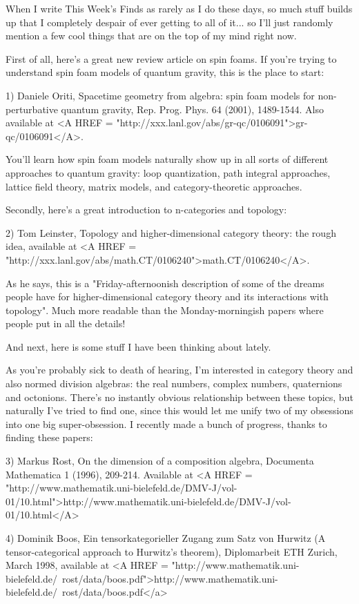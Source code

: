 


When I write This Week's Finds as rarely as I do these days,
so much stuff builds up that I completely despair of ever getting
to all of it... so I'll just randomly mention a few cool things
that are on the top of my mind right now.

First of all, here's a great new review article on spin foams.
If you're trying to understand spin foam models of quantum gravity, 
this is the place to start:

1) Daniele Oriti, Spacetime geometry from algebra: spin foam 
models for non-perturbative quantum gravity,
Rep. Prog. Phys. 64 (2001), 1489-1544.  Also available at
<A HREF = "http://xxx.lanl.gov/abs/gr-qc/0106091">gr-qc/0106091</A>.

You'll learn how spin foam models naturally show up in all sorts 
of different approaches to quantum gravity: loop quantization,
path integral approaches, lattice field theory, matrix models, 
and category-theoretic approaches.  

Secondly, here's a great introduction to n-categories and
topology:

2) Tom Leinster, Topology and higher-dimensional category theory:
the rough idea, available at 
<A HREF = "http://xxx.lanl.gov/abs/math.CT/0106240">math.CT/0106240</A>.

As he says, this is a "Friday-afternoonish description of some
of the dreams people have for higher-dimensional category theory 
and its interactions with topology".  Much more readable than the 
Monday-morningish papers where people put in all the details!

And next, here is some stuff I have been thinking about lately.

As you're probably sick to death of hearing, I'm interested in category
theory and also normed division algebras: the real numbers, complex
numbers, quaternions and octonions.  There's no instantly obvious
relationship between these topics, but naturally I've tried to find
one, since this would let me unify two of my obsessions into one big 
super-obsession.  I recently made a bunch of progress, thanks to finding
these papers:

3) Markus Rost, On the dimension of a composition algebra, 
Documenta Mathematica 1 (1996), 209-214.  Available at 
<A HREF = "http://www.mathematik.uni-bielefeld.de/DMV-J/vol-01/10.html">http://www.mathematik.uni-bielefeld.de/DMV-J/vol-01/10.html</A>

4) Dominik Boos, Ein tensorkategorieller Zugang zum Satz von Hurwitz
(A tensor-categorical approach to Hurwitz's theorem), Diplomarbeit
ETH Zurich, March 1998, available at 
<A HREF = "http://www.mathematik.uni-bielefeld.de/~rost/data/boos.pdf">http://www.mathematik.uni-bielefeld.de/~rost/data/boos.pdf</a>

